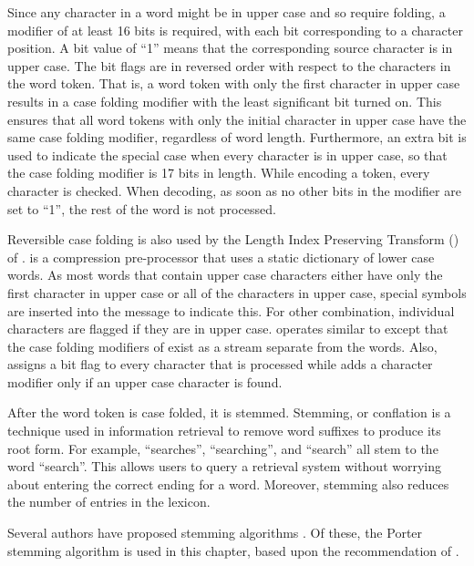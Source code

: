 Since any character in a word might be in upper case and so require folding,
a modifier of at least 16 bits is required, with each bit corresponding 
to a character position.
A bit value of ``1'' means that the corresponding source character 
is in upper case.  The bit flags are in reversed order with respect
to the characters in the word token.  That is, a word token with
only the first character in upper case results in a case folding
modifier with the least significant bit turned on.  This ensures
that all word tokens with only the initial character in upper case
have the same case folding modifier, regardless of word length.
Furthermore, an extra bit is used to indicate the special case 
when every character is in upper case, so that the case folding
modifier is 17 bits in length.
While encoding a token, every character is checked.
When decoding, as soon as no other bits in
the modifier are set to ``1'', the rest of the word is not
processed.

Reversible case folding is also used by the Length
Index Preserving Transform (\lipt) of \citet{am01:itcc}.  
\lipt is a compression pre-processor that uses a static
dictionary of lower case words.  As most words that 
contain upper case characters either have only the first 
character in upper case or all of the characters in upper case, 
special 
symbols are inserted into the message to indicate this.  
For other combination, individual characters are flagged if they 
are in upper case.  \prepair operates similar to \lipt except that
the case folding modifiers of \prepair exist as a stream
separate from the words.
Also, \prepair assigns a bit flag to every character that is
processed while \lipt adds a character modifier only if an upper case
character is found.  


After the word token is case folded, it is stemmed.  
Stemming, or conflation \citep{frakes92:book}
is a technique used 
in information retrieval to remove word suffixes to
produce its root form.  For example, ``searches'',
``searching'', and ``search'' all stem to the word ``search''.
This allows users to query a retrieval system
without worrying about entering the correct ending for a
word.  Moreover, stemming also reduces the number of 
entries in the lexicon.

Several authors have proposed stemming algorithms 
\citep{lovins68:mtcl, dawson74:ballc, porter80:program}.  Of
these, the Porter stemming algorithm is used 
in this chapter, based upon the recommendation of  
\citet{kowalski97:book}. 
 
